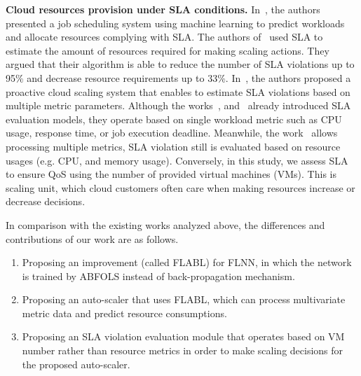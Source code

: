 \documentclass[runningheads]{llncs}
\begin{document}
\textbf{Cloud resources provision under SLA conditions.} In~\cite{ref_reig}, the authors presented a job scheduling system using machine learning to predict workloads and allocate resources complying with SLA. The authors of~\cite{ref_souza} used SLA to estimate the amount of resources required for making scaling actions. They argued that their algorithm is able to reduce the number of SLA violations up to 95$\%$ and decrease resource requirements up to 33$\%$. In~\cite{ref_dang}, the authors proposed a proactive cloud scaling system that enables to estimate SLA violations based on multiple metric parameters. Although the works~\cite{ref_reig}, and~\cite{ref_souza} already introduced SLA evaluation models, they operate based on single workload metric such as CPU usage, response time, or job execution deadline. Meanwhile, the work~\cite{ref_dang} allows processing multiple metrics, SLA violation still is evaluated based on resource usages (e.g. CPU, and memory usage). Conversely, in this study, we assess SLA to ensure QoS using the number of provided virtual machines (VMs). This is scaling unit, which cloud customers often care when making resources increase or decrease decisions. 

In comparison with the existing works analyzed above, the differences and contributions of our work are as follows. 
\begin{enumerate}
	\item Proposing an improvement (called FLABL) for FLNN, in which the network is trained by ABFOLS instead of back-propagation mechanism.
	\item Proposing an auto-scaler that uses  FLABL, %
	which can process multivariate metric data and predict resource consumptions. 
	\item Proposing an SLA violation evaluation module that operates based on VM number rather than resource metrics in order to make scaling decisions for the proposed auto-scaler.
\end{enumerate}

\end{document}
